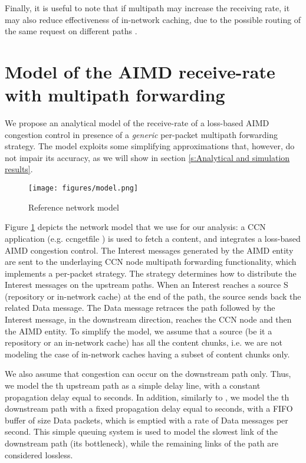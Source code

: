 \documentclass{sig-alternate-10pt}
\begin{document}
Finally, it is useful to note that if multipath may increase the receiving rate, it may also reduce effectiveness of in-network caching, due to the possible routing of the same request on different paths \cite{udugama2013analytical}\cite{rossi2011caching}.





\section{Model of the AIMD receive-rate with multipath forwarding}
We propose an analytical model of the receive-rate of a loss-based AIMD congestion control in presence of a \emph{generic} per-packet multipath forwarding strategy. The model exploits some simplifying approximations that, however, do not impair its accuracy, as we will show in section \ref{s:Analytical and simulation results}.
\begin{figure}[t]
\centering
\texttt{[image: figures/model.png]}
\caption{Reference network model}
\label{f:model1}
\vspace{-10pt}
\end{figure}

Figure \ref{f:model1} depicts the network model that we use for our analysis: a CCN application (e.g. ccngetfile \cite{ccnx}) is used to fetch a content, and integrates a loss-based AIMD congestion control. The Interest messages generated by the AIMD entity are sent to the underlaying CCN node multipath forwarding functionality, which implements a per-packet strategy. The strategy determines how to distribute the Interest messages on the  upstream paths. When an Interest reaches a source S (repository or in-network cache) at the end of the path, the source sends back the related Data message. The Data message retraces the path followed by the Interest message, in the downstream direction, reaches the CCN node and then the AIMD entity. To simplify the model, we assume that a source (be it a repository or an in-network cache) has all the content chunks, i.e. we are not modeling the case of in-network caches having a subset of content chunks only. 

We also assume that congestion can occur on the downstream path only. Thus, we model the th upstream path as a simple delay line, with a constant propagation delay equal to  seconds. In addition, similarly to \cite{jacobson1988congestion}, we model the th downstream path with a fixed propagation delay equal to  seconds, with a FIFO buffer of size  Data packets, which is emptied with a rate of  Data messages per second. This simple queuing system is used to model the slowest link of the downstream path (its bottleneck), while the remaining links of the path are considered lossless.
\end{document}
